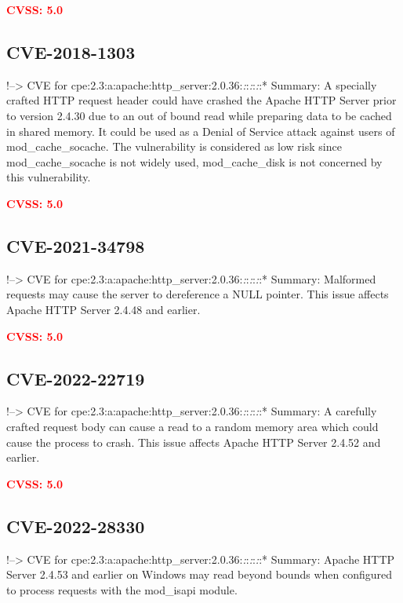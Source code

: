 \documentclass[a4paper, 12pt]{article}
\begin{document}
\textbf{\textcolor{red}{CVSS: 5.0}}

\hypertarget{cve-2018-1303}{%
\subsection{CVE-2018-1303}\label{cve-2018-1303}}

!--\textgreater{} CVE for
cpe:2.3:a:apache:http\_server:2.0.36:\emph{:}:\emph{:}:\emph{:}:*
Summary: A specially crafted HTTP request header could have crashed the
Apache HTTP Server prior to version 2.4.30 due to an out of bound read
while preparing data to be cached in shared memory. It could be used as
a Denial of Service attack against users of mod\_cache\_socache. The
vulnerability is considered as low risk since mod\_cache\_socache is not
widely used, mod\_cache\_disk is not concerned by this vulnerability.

\textbf{\textcolor{red}{CVSS: 5.0}}

\hypertarget{cve-2021-34798}{%
\subsection{CVE-2021-34798}\label{cve-2021-34798}}

!--\textgreater{} CVE for
cpe:2.3:a:apache:http\_server:2.0.36:\emph{:}:\emph{:}:\emph{:}:*
Summary: Malformed requests may cause the server to dereference a NULL
pointer. This issue affects Apache HTTP Server 2.4.48 and earlier.

\textbf{\textcolor{red}{CVSS: 5.0}}

\hypertarget{cve-2022-22719}{%
\subsection{CVE-2022-22719}\label{cve-2022-22719}}

!--\textgreater{} CVE for
cpe:2.3:a:apache:http\_server:2.0.36:\emph{:}:\emph{:}:\emph{:}:*
Summary: A carefully crafted request body can cause a read to a random
memory area which could cause the process to crash. This issue affects
Apache HTTP Server 2.4.52 and earlier.

\textbf{\textcolor{red}{CVSS: 5.0}}

\hypertarget{cve-2022-28330}{%
\subsection{CVE-2022-28330}\label{cve-2022-28330}}

!--\textgreater{} CVE for
cpe:2.3:a:apache:http\_server:2.0.36:\emph{:}:\emph{:}:\emph{:}:*
Summary: Apache HTTP Server 2.4.53 and earlier on Windows may read
beyond bounds when configured to process requests with the mod\_isapi
module.
\end{document}
